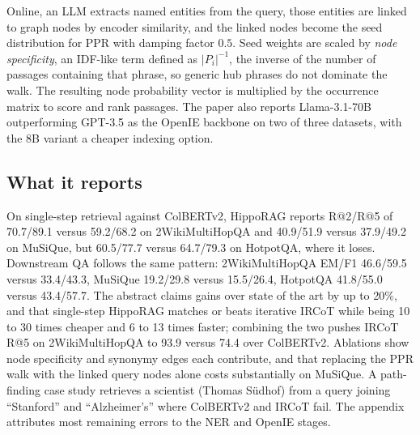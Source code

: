 Online, an LLM extracts named entities from the query, those entities are linked to graph nodes by encoder similarity, and the linked nodes become the seed distribution for PPR with damping factor $0.5$. Seed weights are scaled by \emph{node specificity}, an IDF-like term defined as $|P_i|^{-1}$, the inverse of the number of passages containing that phrase, so generic hub phrases do not dominate the walk. The resulting node probability vector is multiplied by the occurrence matrix to score and rank passages. The paper also reports Llama-3.1-70B outperforming GPT-3.5 as the OpenIE backbone on two of three datasets, with the 8B variant a cheaper indexing option.

\begin{center}
\end{center}

\subsection{What it reports}

On single-step retrieval against ColBERTv2, HippoRAG reports R@2/R@5 of 70.7/89.1 versus 59.2/68.2 on 2WikiMultiHopQA and 40.9/51.9 versus 37.9/49.2 on MuSiQue, but 60.5/77.7 versus 64.7/79.3 on HotpotQA, where it loses. Downstream QA follows the same pattern: 2WikiMultiHopQA EM/F1 46.6/59.5 versus 33.4/43.3, MuSiQue 19.2/29.8 versus 15.5/26.4, HotpotQA 41.8/55.0 versus 43.4/57.7. The abstract claims gains over state of the art by up to 20\%, and that single-step HippoRAG matches or beats iterative IRCoT while being 10 to 30 times cheaper and 6 to 13 times faster; combining the two pushes IRCoT R@5 on 2WikiMultiHopQA to 93.9 versus 74.4 over ColBERTv2. Ablations show node specificity and synonymy edges each contribute, and that replacing the PPR walk with the linked query nodes alone costs substantially on MuSiQue. A path-finding case study retrieves a scientist (Thomas S\"udhof) from a query joining ``Stanford'' and ``Alzheimer's'' where ColBERTv2 and IRCoT fail. The appendix attributes most remaining errors to the NER and OpenIE stages.

